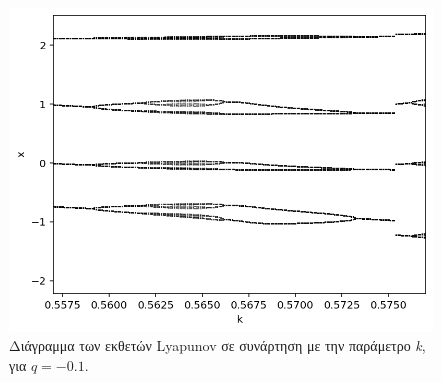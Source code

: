 \begin{figure}[ht]
	\centering
	\includegraphics[width=1\linewidth]{LateX images/graphs/g2}
	\caption{Διάγραμμα των εκθετών Lyapunov σε συνάρτηση με την παράμετρο \emph{k}, για $q=-0.1$.}
	\label{f:g7}
\end{figure}



